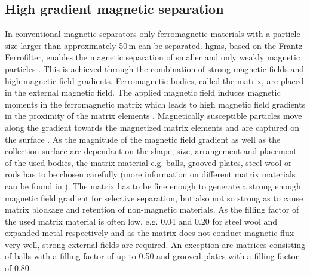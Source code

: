 \subsection{High gradient magnetic separation}
\label{subsec:HGMS}
In conventional magnetic separators only ferromagnetic materials with a particle size larger than approximately 50\,\textmu m can be separated. \Gls{hgms}, based on the Frantz Ferrofilter, enables the magnetic separation of smaller and only weakly magnetic particles \cite{frantz1937patent,ge2017magnetic}. This is achieved through the combination of strong magnetic fields and high magnetic field gradients. Ferromagnetic bodies, called the matrix, are placed in the external magnetic field. The applied magnetic field induces magnetic moments in the ferromagnetic matrix which leads to high magnetic field gradients in the proximity of the matrix elements \cite{shukla2006process}. Magnetically susceptible particles move along the gradient towards the magnetized matrix elements and are captured on the surface \cite{hoffmann2002novel}. As the magnitude of the magnetic field gradient as well as the collection surface are dependant on the shape, size, arrangement and placement of the used bodies, the matrix material e.g. balls, grooved plates, steel wool or rods has to be chosen carefully (more information on different matrix materials can be found in \cite{iacob2002high,kim2013effects,takayasu1981matrices}). The matrix has to be fine enough to generate a strong enough magnetic field gradient for selective separation, but also not so strong as to cause matrix blockage and retention of non-magnetic materials. As the filling factor of the used matrix material is often low, e.g. 0.04 and 0.20 for steel wool and expanded metal respectively and as the matrix does not conduct magnetic flux very well, strong external fields are required. An exception are matrices consisting of balls with a filling factor of up to 0.50 and grooved plates with a filling factor of 0.80. 



